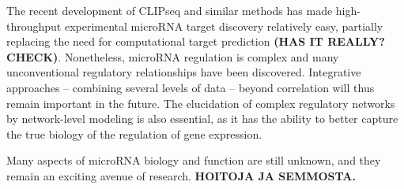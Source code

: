 The recent development of CLIPseq and similar methods has made high-throughput
experimental microRNA target discovery relatively easy, partially replacing
the need for computational target prediction \textbf{(HAS IT REALLY? CHECK)}.
Nonetheless, microRNA regulation is complex and many unconventional regulatory
relationships have been discovered. Integrative approaches -- combining several
levels of data -- beyond correlation will thus remain important in the future.
The elucidation of complex regulatory networks by network-level modeling is
also essential, as it has the ability to better capture the true biology of
the regulation of gene expression.

Many aspects of microRNA biology and function are still unknown, and they 
remain an exciting avenue of research. \textbf{HOITOJA JA SEMMOSTA.}